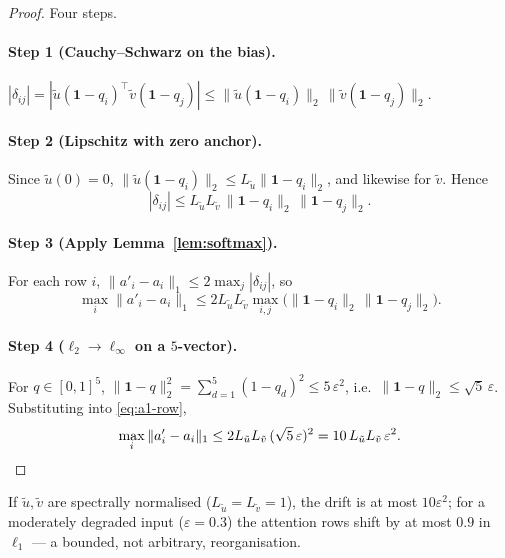 \begin{proof}
Four steps.

\paragraph{Step 1 (Cauchy--Schwarz on the bias).}
$|\delta_{ij}| = |\tilde{u}(\mathbf{1}-q_i)^\top\tilde{v}(\mathbf{1}-q_j)|
\leq \|\tilde{u}(\mathbf{1}-q_i)\|_2\,\|\tilde{v}(\mathbf{1}-q_j)\|_2.$

\paragraph{Step 2 (Lipschitz with zero anchor).}
Since $\tilde{u}(0)=0$, $\|\tilde{u}(\mathbf{1}-q_i)\|_2\leq L_{\tilde{u}}\|\mathbf{1}-q_i\|_2$, and
likewise for $\tilde{v}$. Hence
\begin{equation}
|\delta_{ij}| \leq L_{\tilde{u}}L_{\tilde{v}}\,\|\mathbf{1}-q_i\|_2\,\|\mathbf{1}-q_j\|_2.
\label{eq:a1-bias}
\end{equation}

\paragraph{Step 3 (Apply Lemma~\ref{lem:softmax}).}
For each row $i$, $\|a'_i-a_i\|_1\leq 2\max_j|\delta_{ij}|$, so
\begin{equation}
\max_i\|a'_i-a_i\|_1
\leq 2L_{\tilde{u}}L_{\tilde{v}}\max_{i,j}\big(\|\mathbf{1}-q_i\|_2\,\|\mathbf{1}-q_j\|_2\big).
\label{eq:a1-row}
\end{equation}

\paragraph{Step 4 ($\ell_2\to\ell_\infty$ on a $5$-vector).}
For $q\in[0,1]^5$, $\|\mathbf{1}-q\|_2^2=\sum_{d=1}^5(1-q_d)^2\leq 5\,\varepsilon^2$, i.e.\
$\|\mathbf{1}-q\|_2\leq\sqrt{5}\,\varepsilon$. Substituting into \eqref{eq:a1-row},
\begin{equation}
\max_i\|a'_i-a_i\|_1 \leq 2L_{\tilde{u}}L_{\tilde{v}}\,(\sqrt{5}\,\varepsilon)^2
= 10\,L_{\tilde{u}}L_{\tilde{v}}\,\varepsilon^2. \qedhere
\end{equation}
\end{proof}

\begin{corollary}\label{cor:a1-spectral}
If $\tilde{u},\tilde{v}$ are spectrally normalised \citep{miyato2018spectral}
($L_{\tilde{u}}=L_{\tilde{v}}=1$), the drift is at
most $10\varepsilon^2$; for a moderately degraded input ($\varepsilon=0.3$) the attention rows shift by
at most $0.9$ in $\ell_1$ --- a bounded, not arbitrary, reorganisation.
\end{corollary}

